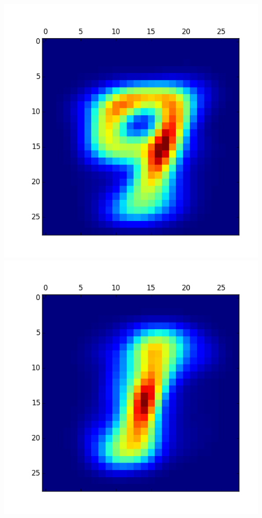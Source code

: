 \documentclass[11pt]{article}
\begin{document}
\begin{itemize}
\includegraphics[scale = 0.5]{3.png}
\includegraphics[scale = 0.5]{4.png}


\end{itemize}
\end{document}
